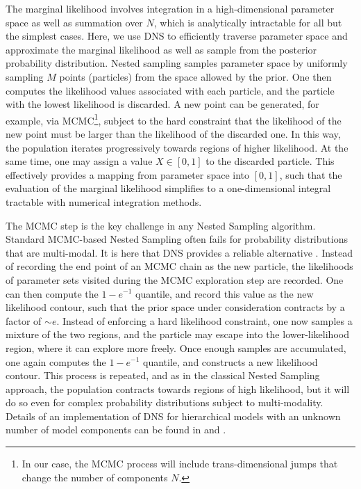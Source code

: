 \documentclass[12pt]{emulateapj}
\begin{document}
The marginal likelihood involves integration in a high-dimensional parameter space as well as summation over $N$, which is analytically intractable for all but the
simplest cases. Here, we use DNS to efficiently traverse parameter space and approximate the marginal 
likelihood as well as sample from the posterior probability distribution. 
Nested sampling \citep{skilling2006} samples parameter space by uniformly sampling $M$ points (particles) from the space allowed by the prior. 
One then computes the likelihood values associated with each particle, and the particle with the lowest likelihood is discarded. A new point
can be generated, for example, via MCMC\footnote{In our case, the MCMC process will include trans-dimensional jumps that change the number of components $N$.}, subject to the hard constraint that the
likelihood of the new point must be larger than the likelihood of the discarded one. In this way, the population iterates progressively towards
regions of higher likelihood. At the same time, one may assign a value $X  \in [0, 1]$ to the discarded particle. This effectively provides a 
mapping from parameter space into $[0,1]$, such that the evaluation of the marginal likelihood simplifies to a one-dimensional 
integral tractable with numerical integration methods.

The MCMC step is the key challenge in any Nested Sampling algorithm. Standard MCMC-based Nested Sampling often fails for probability distributions that
are multi-modal. It is here that DNS provides a reliable alternative \citep[for details, see][]{brewer2011}. 
Instead of recording the end point of an MCMC chain as the new particle, the likelihoods of parameter sets visited during the MCMC exploration step
 are recorded. One can then compute the $1-e^{-1}$ quantile, and record this value as the new likelihood contour, such that the prior space
 under consideration contracts by a factor of $\sim\!\! e$. Instead of enforcing a hard likelihood constraint, one now samples a mixture of the 
 two regions, and the particle may escape into the lower-likelihood region, where it can explore more freely. Once enough samples are accumulated,
 one again computes the $1-e^{-1}$ quantile, and constructs a new likelihood contour. This process is repeated, and as in the classical Nested Sampling
 approach, the population contracts towards regions of high likelihood, but it will do so even for complex probability distributions subject to multi-modality.
 Details of an implementation of DNS for hierarchical models with an unknown number of model components can be found in \citet{brewer2013} and \citet{brewer2014}.
 
\end{document}
